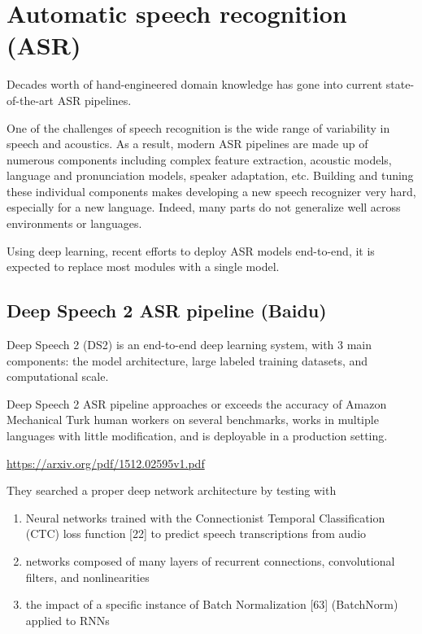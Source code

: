  

\chapter{Automatic speech recognition (ASR)}

Decades worth of hand-engineered domain knowledge has gone into current state-of-the-art ASR pipelines.

One of the challenges of speech recognition is the wide range of variability in
speech and acoustics.
As a result, modern ASR pipelines are made up of numerous components including
complex feature extraction, acoustic models, language and pronunciation models,
speaker adaptation, etc. Building and tuning these individual components makes
developing a new speech recognizer very hard, especially for a new language.
Indeed, many parts do not generalize well across environments or languages.


Using deep learning, recent efforts to deploy ASR models end-to-end, it is
expected to replace most modules with a single model.

\section{ Deep Speech 2 ASR pipeline (Baidu)}
\label{sec:DS2-Baidu}

Deep Speech 2 (DS2) is an end-to-end deep learning system, with 3 main
components:
the model architecture, large labeled training datasets, and computational
scale.

Deep Speech 2 ASR pipeline approaches or exceeds the accuracy of Amazon
Mechanical Turk human workers on several benchmarks, works in multiple languages
with little modification, and is deployable in a production setting.

\url{https://arxiv.org/pdf/1512.02595v1.pdf}

They searched a proper deep network architecture by testing with
\begin{enumerate}
  \item  Neural networks trained with the Connectionist Temporal Classification (CTC)
loss function [22] to predict speech transcriptions from audio

  \item networks composed of many layers of recurrent connections, convolutional filters, and nonlinearities

  \item the impact of a specific instance of Batch Normalization [63] (BatchNorm) applied to RNNs

\end{enumerate}

